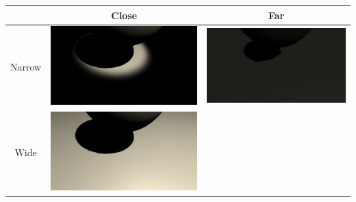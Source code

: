 \begin{table}
  \centering
  \begin{tabular}{| c | c | c | }
    \hline
    & Close & Far \\ \hline
    Narrow &  \begin{minipage}{.5\textwidth}
            \includegraphics[width=\linewidth]{figures/shadows/spot-cleaned}
            \end{minipage}
            &
            \begin{minipage}{.5\textwidth}
            \includegraphics[width=\linewidth]{figures/shadows/spot-far-cleaned}
            \end{minipage}
    \\ \hline
    Wide &  \begin{minipage}{.5\textwidth}
            \includegraphics[width=\linewidth]{figures/shadows/spot-wide-cleaned}

\end{minipage}
\end{tabular}
\end{table}
